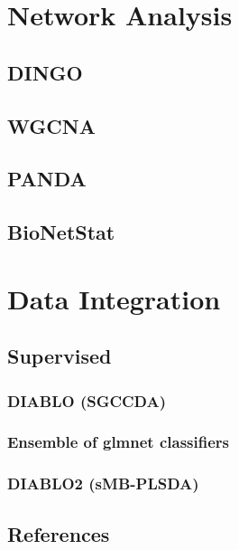 \documentclass[]{book}
\begin{document}
\chapter{Network Analysis}\label{network-analysis}

\section{DINGO}\label{dingo}

\section{WGCNA}\label{wgcna}

\section{PANDA}\label{panda}

\section{BioNetStat}\label{bionetstat}

\chapter{Data Integration}\label{data-integration}

\section{Supervised}\label{supervised}

\subsection{DIABLO (SGCCDA)}\label{diablo-sgccda}

\subsection{Ensemble of glmnet
classifiers}\label{ensemble-of-glmnet-classifiers}

\subsection{DIABLO2 (sMB-PLSDA)}\label{diablo2-smb-plsda}

\section{References}\label{references-1}
\end{document}
